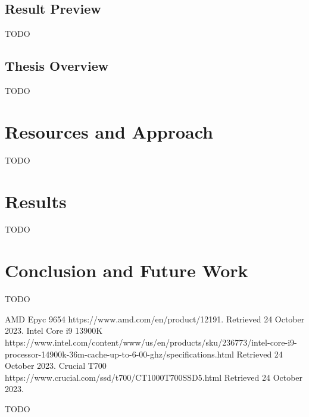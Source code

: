 \documentclass[12pt]{article}
\begin{document}
	\subsection{Result Preview}
	TODO
	\subsection{Thesis Overview}
	TODO
	
	
	
	
	
	\section{Resources and Approach}
	TODO
	\section{Results}
	TODO
	\section{Conclusion and Future Work}
	TODO

	\begin{thebibliography}{9}
		AMD Epyc 9654 https://www.amd.com/en/product/12191. Retrieved 24 October 2023.
		Intel Core i9 13900K https://www.intel.com/content/www/us/en/products/sku/236773/intel-core-i9-processor-14900k-36m-cache-up-to-6-00-ghz/specifications.html Retrieved 24 October 2023.
		Crucial T700 https://www.crucial.com/ssd/t700/CT1000T700SSD5.html Retrieved 24 October 2023.
	\end{thebibliography}
	TODO
\end{document}
